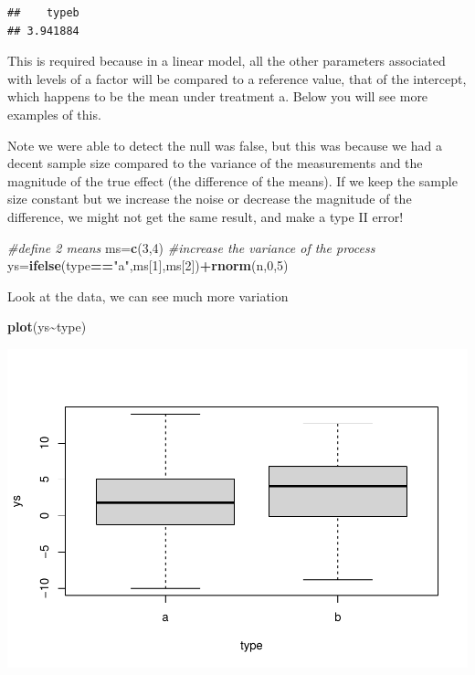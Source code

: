 \documentclass[
]{book}
\newenvironment{Shaded}{\begin{snugshade}}{\end{snugshade}}
\newcommand{\CommentTok}[1]{\textcolor[rgb]{0.56,0.35,0.01}{\textit{#1}}}
\newcommand{\DecValTok}[1]{\textcolor[rgb]{0.00,0.00,0.81}{#1}}
\newcommand{\FunctionTok}[1]{\textcolor[rgb]{0.13,0.29,0.53}{\textbf{#1}}}
\newcommand{\NormalTok}[1]{#1}
\newcommand{\OtherTok}[1]{\textcolor[rgb]{0.56,0.35,0.01}{#1}}
\newcommand{\SpecialCharTok}[1]{\textcolor[rgb]{0.81,0.36,0.00}{\textbf{#1}}}
\newcommand{\StringTok}[1]{\textcolor[rgb]{0.31,0.60,0.02}{#1}}
\begin{document}
\begin{verbatim}
##    typeb 
## 3.941884
\end{verbatim}

This is required because in a linear model, all the other parameters associated with levels of a factor will be compared to a reference value, that of the intercept, which happens to be the mean under treatment a. Below you will see more examples of this.

Note we were able to detect the null was false, but this was because we had a decent sample size compared to the variance of the measurements and the magnitude of the true effect (the difference of the means). If we keep the sample size constant but we increase the noise or decrease the magnitude of the difference, we might not get the same result, and make a type II error!

\begin{Shaded}
\begin{Highlighting}[]
\CommentTok{\#define 2 means}
\NormalTok{ms}\OtherTok{=}\FunctionTok{c}\NormalTok{(}\DecValTok{3}\NormalTok{,}\DecValTok{4}\NormalTok{)}
\CommentTok{\#increase the variance of the process}
\NormalTok{ys}\OtherTok{=}\FunctionTok{ifelse}\NormalTok{(type}\SpecialCharTok{==}\StringTok{"a"}\NormalTok{,ms[}\DecValTok{1}\NormalTok{],ms[}\DecValTok{2}\NormalTok{])}\SpecialCharTok{+}\FunctionTok{rnorm}\NormalTok{(n,}\DecValTok{0}\NormalTok{,}\DecValTok{5}\NormalTok{)}
\end{Highlighting}
\end{Shaded}

Look at the data, we can see much more variation

\begin{Shaded}
\begin{Highlighting}[]
\FunctionTok{plot}\NormalTok{(ys}\SpecialCharTok{\textasciitilde{}}\NormalTok{type)}
\end{Highlighting}
\end{Shaded}

\includegraphics{ECOMODbook_files/figure-latex/a8.12-1.pdf}
\end{document}
